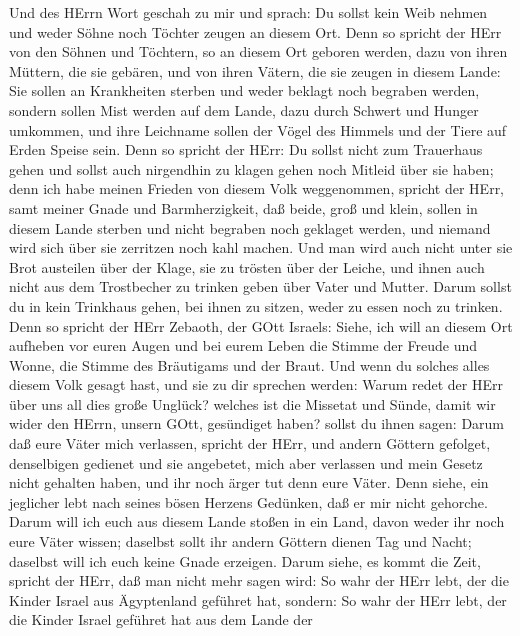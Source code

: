  Und des HErrn Wort geschah zu mir und sprach: 
Du sollst kein Weib nehmen und weder Söhne noch Töchter zeugen an diesem
Ort.  Denn so spricht der HErr von den Söhnen und Töchtern,
so an diesem Ort geboren werden, dazu von ihren Müttern, die sie
gebären, und von ihren Vätern, die sie zeugen in diesem Lande:
 Sie sollen an Krankheiten sterben und weder beklagt noch
begraben werden, sondern sollen Mist werden auf dem Lande, dazu durch
Schwert und Hunger umkommen, und ihre Leichname sollen der Vögel des
Himmels und der Tiere auf Erden Speise sein.  Denn so
spricht der HErr: Du sollst nicht zum Trauerhaus gehen und sollst auch
nirgendhin zu klagen gehen noch Mitleid über sie haben; denn ich habe
meinen Frieden von diesem Volk weggenommen, spricht der HErr, samt
meiner Gnade und Barmherzigkeit,  daß beide, groß und klein,
sollen in diesem Lande sterben und nicht begraben noch geklaget werden,
und niemand wird sich über sie zerritzen noch kahl machen. 
Und man wird auch nicht unter sie Brot austeilen über der Klage, sie zu
trösten über der Leiche, und ihnen auch nicht aus dem Trostbecher zu
trinken geben über Vater und Mutter.  Darum sollst du in
kein Trinkhaus gehen, bei ihnen zu sitzen, weder zu essen noch zu
trinken.  Denn so spricht der HErr Zebaoth, der GOtt
Israels: Siehe, ich will an diesem Ort aufheben vor euren Augen und bei
eurem Leben die Stimme der Freude und Wonne, die Stimme des Bräutigams
und der Braut.  Und wenn du solches alles diesem Volk
gesagt hast, und sie zu dir sprechen werden: Warum redet der HErr über
uns all dies große Unglück? welches ist die Missetat und Sünde, damit
wir wider den HErrn, unsern GOtt, gesündiget haben?  sollst
du ihnen sagen: Darum daß eure Väter mich verlassen, spricht der HErr,
und andern Göttern gefolget, denselbigen gedienet und sie angebetet,
mich aber verlassen und mein Gesetz nicht gehalten haben, 
und ihr noch ärger tut denn eure Väter. Denn siehe, ein jeglicher lebt
nach seines bösen Herzens Gedünken, daß er mir nicht gehorche.
 Darum will ich euch aus diesem Lande stoßen in ein Land,
davon weder ihr noch eure Väter wissen; daselbst sollt ihr andern
Göttern dienen Tag und Nacht; daselbst will ich euch keine Gnade
erzeigen.  Darum siehe, es kommt die Zeit, spricht der
HErr, daß man nicht mehr sagen wird: So wahr der HErr lebt, der die
Kinder Israel aus Ägyptenland geführet hat,  sondern: So
wahr der HErr lebt, der die Kinder Israel geführet hat aus dem Lande der
